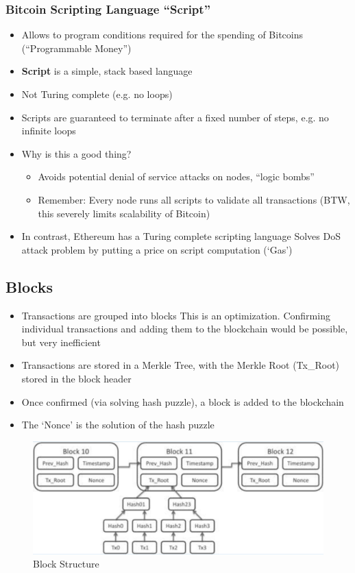 \subsubsection{Bitcoin Scripting Language ``Script''}
\begin{itemize}
	\item Allows to program conditions required for the spending of Bitcoins (``Programmable Money'')
	\item \textbf{Script} is a simple, stack based language
	\item Not Turing complete (e.g. no loops)
	\item Scripts are guaranteed to terminate after a fixed number of steps, e.g. no infinite loops
	\item Why is this a good thing?
	\begin{itemize}
		\item Avoids potential denial of service attacks on nodes, ``logic bombs''
		\item Remember: Every node runs all scripts to validate all transactions (BTW, this severely limits scalability of Bitcoin)
	\end{itemize}
	\item In contrast, Ethereum has a Turing complete scripting language
	\subitem Solves DoS attack problem by putting a price on script computation (`Gas')
\end{itemize}

\subsection{Blocks}
\begin{itemize}
	\item Transactions are grouped into blocks
	\subitem This is an optimization. Confirming individual transactions and adding them to the blockchain would be possible, but very inefficient
	\item Transactions are stored in a Merkle Tree, with the Merkle Root (Tx\_Root) stored in the block header
	\item Once confirmed (via solving hash puzzle), a block is added to the blockchain
	\item The `Nonce' is the solution of the hash puzzle
\end{itemize}
\begin{figure}[H]
	\includegraphics[width=\linewidth]{blockStructure}
	\centering
	\caption{Block Structure}
\end{figure}
